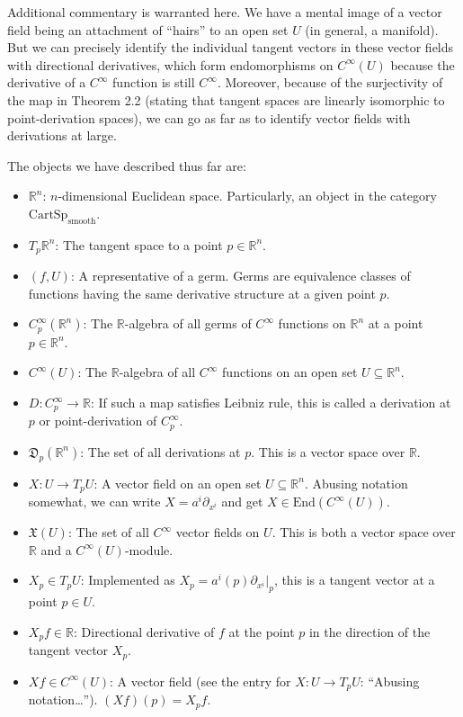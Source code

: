 \documentclass[a4paper]{article}
\newcommand{\R}{\mathbb{R}}
\begin{document}
Additional commentary is warranted here. We have a mental image of a vector field being an attachment of ``hairs'' to an open set $U$ (in general, a manifold). But we can precisely identify the individual tangent vectors in these vector fields with directional derivatives, which form endomorphisms on $C^\infty(U)$ because the derivative of a $C^\infty$ function is still $C^\infty$. Moreover, because of the surjectivity of the map in Theorem 2.2 (stating that tangent spaces are linearly isomorphic to point-derivation spaces), we can go as far as to identify vector fields with derivations at large.

The objects we have described thus far are:
\begin{itemize}
    \item $\R^n$: $n$-dimensional Euclidean space. Particularly, an object in the category $\text{CartSp}_\text{smooth}$.
    \item $T_p\R^n$: The tangent space to a point $p \in \R^n$.
    \item $(f, U)$: A representative of a germ. Germs are equivalence classes of functions having the same derivative structure at a given point $p$.
    \item $C_p^\infty(\R^n)$: The $\R$-algebra of all germs of $C^\infty$ functions on $\R^n$ at a point $p \in \R^n$.
    \item $C^\infty(U)$: The $\R$-algebra of all $C^\infty$ functions on an open set $U \subseteq \R^n$.
    \item $D : C_p^\infty \to \R$: If such a map satisfies Leibniz rule, this is called a derivation at $p$ or point-derivation of $C_p^\infty$.
    \item $\mathfrak{D}_p(\R^n)$: The set of all derivations at $p$. This is a vector space over $\R$.
    \item $X : U \to T_pU$: A vector field on an open set $U \subseteq \R^n$. Abusing notation somewhat, we can write $X = a^i\partial_{x^i}$ and get $X \in \text{End}(C^\infty(U))$.
    \item $\mathfrak{X}(U)$: The set of all $C^\infty$ vector fields on $U$. This is both a vector space over $\R$ and a $C^\infty(U)$-module.
    \item $X_p \in T_pU$: Implemented as $X_p = a^i(p)\partial_{x^i}|_p$, this is a tangent vector at a point $p \in U$.
    \item $X_pf \in \R$: Directional derivative of $f$ at the point $p$ in the direction of the tangent vector $X_p$.
    \item $Xf \in C^\infty(U)$: A vector field (see the entry for $X : U \to T_pU$: ``Abusing notation\ldots''). $(Xf)(p) = X_pf$.
\end{itemize}
\end{document}
